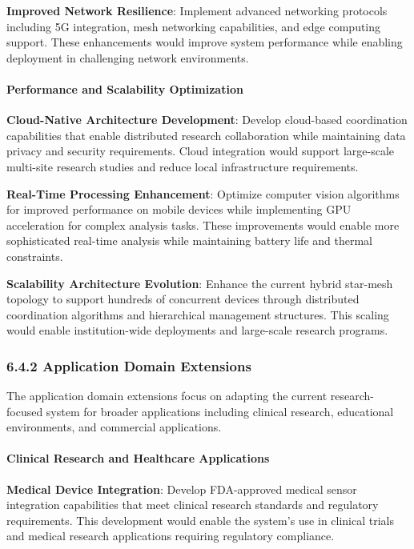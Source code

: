 \documentclass[11pt,a4paper]{article}
\begin{document}
\textbf{Improved Network Resilience}: Implement advanced networking protocols including 5G integration, mesh networking
capabilities, and edge computing support. These enhancements would improve system performance while enabling deployment
in challenging network environments.

\paragraph{Performance and Scalability Optimization}

\textbf{Cloud-Native Architecture Development}: Develop cloud-based coordination capabilities that enable distributed
research collaboration while maintaining data privacy and security requirements. Cloud integration would support
large-scale multi-site research studies and reduce local infrastructure requirements.

\textbf{Real-Time Processing Enhancement}: Optimize computer vision algorithms for improved performance on mobile devices
while implementing GPU acceleration for complex analysis tasks. These improvements would enable more sophisticated
real-time analysis while maintaining battery life and thermal constraints.

\textbf{Scalability Architecture Evolution}: Enhance the current hybrid star-mesh topology to support hundreds of concurrent
devices through distributed coordination algorithms and hierarchical management structures. This scaling would enable
institution-wide deployments and large-scale research programs.

\subsubsection{6.4.2 Application Domain Extensions}

The application domain extensions focus on adapting the current research-focused system for broader applications
including clinical research, educational environments, and commercial applications.

\paragraph{Clinical Research and Healthcare Applications}

\textbf{Medical Device Integration}: Develop FDA-approved medical sensor integration capabilities that meet clinical research
standards and regulatory requirements. This development would enable the system's use in clinical trials and medical
research applications requiring regulatory compliance.
\end{document}
